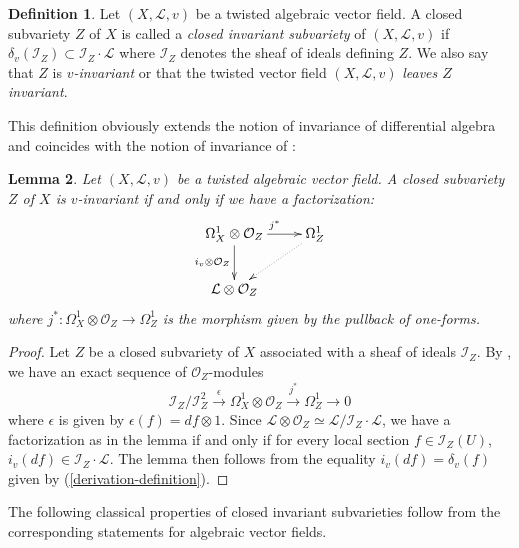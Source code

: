 \documentclass[12pt]{amsart}
\theoremstyle{definition}
\newtheorem{definition}{Definition}[subsection]
\theoremstyle{plain}
\newtheorem{lemma}[definition]{Lemma}
\theoremstyle{exampstyle}
\theoremstyle{exampstyle}\newtheorem{thmxbis}{Theorem}
\numberwithin{equation}{section}
\theoremstyle{remark}
\begin{document}
\begin{definition} 
Let $(X,\mathcal L,v)$ be a twisted algebraic vector field. A closed subvariety $Z$ of $X$ is called a {\em{closed invariant subvariety}} of $(X,\mathcal L,v)$ if
$\delta_v(\mathcal I_Z) \subset \mathcal I_Z\cdot\mathcal L$
where $\mathcal I_Z$ denotes the sheaf of ideals defining $Z$. We also say that $Z$ is {\em $v$-invariant} or that the twisted vector field $(X,\mathcal L,v)$ {\em leaves $Z$ invariant}.
\end{definition}

This definition obviously extends the notion of invariance of differential algebra and coincides with the notion of invariance of \citep[Section 2.2]{Coutinho-Pereira}:
\begin{lemma} 
Let $(X,\mathcal L,v)$ be a twisted algebraic vector field. A closed subvariety $Z$ of $X$ is $v$-invariant if and only if we have a factorization: 
$$\xymatrix{\Omega^1_X \otimes \mathcal O_Z \ar[r]^{j^\ast} \ar[d]_{i_v\otimes \mathcal O_Z}  & \Omega^1_Z \ar@{..>}[ld] \\ \mathcal L \otimes \mathcal O_Z}$$ 
where $j^\ast: \Omega^1_X \otimes \mathcal O_Z \rightarrow \Omega^1_Z$ is the morphism given by the pullback of one-forms.
\end{lemma} 

\begin{proof} 

Let $Z$ be a closed subvariety of $X$ associated with a sheaf of ideals $\mathcal I_Z$. By  \cite[Proposition 8.4A]{Hartshorne}, we have an exact sequence of $\mathcal O_Z$-modules
$$ \mathcal I_Z /\mathcal I_Z^2 \overset{\epsilon}{\rightarrow} \Omega^1_X \otimes \mathcal O_Z \overset{j^\ast}{\rightarrow} \Omega^1_Z \rightarrow 0$$
where $\epsilon$ is given by $\epsilon(f) = df \otimes 1$. Since $\mathcal L \otimes \mathcal O_Z \simeq \mathcal L / \mathcal I_Z \cdot \mathcal L$, we have a factorization as in the lemma if and only if for every local section $f \in \mathcal I_Z(U)$,
$i_v(df) \in \mathcal I_Z\cdot \mathcal L.$
The lemma then follows from the equality $i_v(df) = \delta_v(f)$
given by (\ref{derivation-definition}).
\end{proof}
\noindent The following classical properties of closed invariant subvarieties follow from the corresponding statements for algebraic vector fields. 
\end{document}
